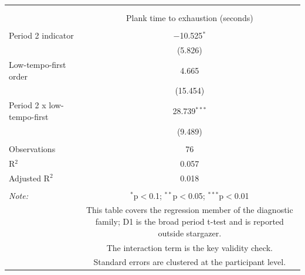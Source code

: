 
\begingroup 
\scriptsize 
\begin{tabular}{@{\extracolsep{3pt}}lc} 
\\[-1.8ex]\hline 
\hline \\[-1.8ex] 
\\[-1.8ex] & Plank time to exhaustion (seconds) \\ 
\hline \\[-1.8ex] 
 Period 2 indicator & $-$10.525$^{*}$ \\ 
  & (5.826) \\ 
  Low-tempo-first order & 4.665 \\ 
  & (15.454) \\ 
  Period 2 x low-tempo-first & 28.739$^{***}$ \\ 
  & (9.489) \\ 
 \hline \\[-1.8ex] 
Observations & 76 \\ 
R$^{2}$ & 0.057 \\ 
Adjusted R$^{2}$ & 0.018 \\ 
\hline 
\hline \\[-1.8ex] 
\textit{Note:}  & \multicolumn{1}{p{0.82\textwidth}}{$^{*}$p$<$0.1; $^{**}$p$<$0.05; $^{***}$p$<$0.01} \\ 
 & \multicolumn{1}{p{0.82\textwidth}}{This table covers the regression member of the diagnostic family; D1 is the broad period t-test and is reported outside stargazer.} \\ 
 & \multicolumn{1}{p{0.82\textwidth}}{The interaction term is the key validity check.} \\ 
 & \multicolumn{1}{p{0.82\textwidth}}{Standard errors are clustered at the participant level.} \\ 
\end{tabular} 
\endgroup 
